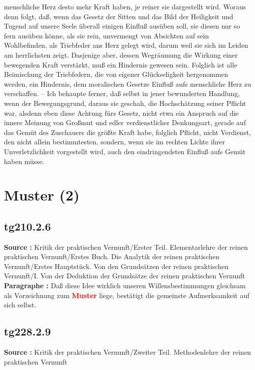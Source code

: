 \documentclass[a4paper,12pt,twoside]{book}
\newcommand{\match}[1]{\textcolor{red}{\textbf{#1}}}
\newcommand{\unnumberedsection}[1]{
	\section*{#1}
	\addcontentsline{toc}{section}{#1}
	\markright{#1}
}
\begin{document}
menschliche Herz desto mehr Kraft haben, je reiner sie dargestellt wird. Woraus denn folgt, daß, wenn das Gesetz der Sitten und das Bild der Heiligkeit und Tugend auf unsere Seele überall einigen Einfluß ausüben soll, sie diesen nur so fern ausüben könne, als sie rein, unvermengt von Absichten auf sein Wohlbefinden, als Triebfeder ans Herz gelegt wird, darum weil sie sich im Leiden am herrlichsten zeigt. Dasjenige aber, dessen Wegräumung die Wirkung einer bewegenden Kraft verstärkt, muß ein Hindernis gewesen sein. Folglich ist alle Beimischung der Triebfedern, die von eigener Glückseligkeit hergenommen werden, ein Hindernis, dem moralischen Gesetze Einfluß aufs menschliche Herz zu verschaffen. – Ich behaupte ferner, daß selbst in jener bewunderten Handlung, wenn der Bewegungsgrund, daraus sie geschah, die Hochschätzung seiner Pflicht war, alsdenn eben diese Achtung fürs Gesetz, nicht etwa ein Anspruch  auf die innere Meinung von Großmut und edler verdienstlicher Denkungsart, gerade auf das Gemüt des Zuschauers die größte Kraft habe, folglich Pflicht, nicht Verdienst, den nicht allein bestimmtesten, sondern, wenn sie im rechten Lichte ihrer Unverletzlichkeit vorgestellt wird, auch den eindringendsten Einfluß aufs Gemüt haben müsse. 
	
	\unnumberedsection{Muster (2)} 
	\subsection*{tg210.2.6} 
	\textbf{Source : }Kritik der praktischen Vernunft/Erster Teil. Elementarlehre der reinen praktischen Vernunft/Erstes Buch. Die Analytik der reinen praktischen Vernunft/Erstes Hauptstück. Von den Grundsätzen der reinen praktischen Vernunft/I. Von der Deduktion der Grundsätze der reinen praktischen Vernunft\\  
	
	\noindent\textbf{Paragraphe : }Daß diese Idee wirklich unseren Willensbestimmungen gleichsam als Vorzeichnung zum \match{Muster} liege, bestätigt die gemeinste Aufmerksamkeit auf sich selbst. 
	
	\subsection*{tg228.2.9} 
	\textbf{Source : }Kritik der praktischen Vernunft/Zweiter Teil. Methodenlehre der reinen praktischen Vernunft\\  
	
\end{document}
